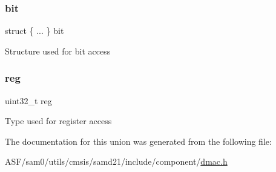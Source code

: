 \subsubsection{\texorpdfstring{bit}{bit}}
{\footnotesize\ttfamily struct \{ ... \}   bit}

Structure used for bit access \mbox{\label{union_d_m_a_c___b_a_s_e_a_d_d_r___type_a6b91636401516a477989a336376d7b40}} 
\subsubsection{\texorpdfstring{reg}{reg}}
{\footnotesize\ttfamily uint32\+\_\+t reg}

Type used for register access 

The documentation for this union was generated from the following file\+:\begin{DoxyCompactItemize}
\item 
A\+S\+F/sam0/utils/cmsis/samd21/include/component/\mbox{\hyperlink{component_2dmac_8h}{dmac.\+h}}\end{DoxyCompactItemize}
